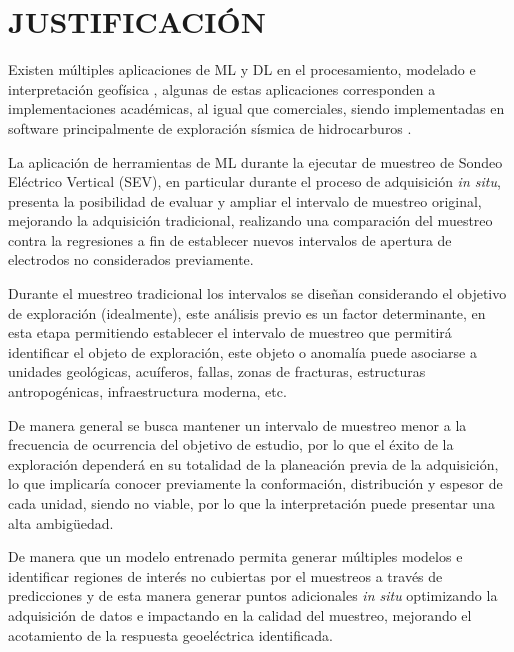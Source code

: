 \chapter{JUSTIFICACIÓN}
Existen múltiples aplicaciones de ML y DL en el procesamiento, modelado e interpretación geofísica \citep{li2024, liu2020,el2001,wrona2018}, algunas de estas aplicaciones corresponden a implementaciones académicas, al igual que comerciales, siendo implementadas en software principalmente de exploración sísmica de hidrocarburos \citep{diaferia2024high, panebianco2024automated}.



La aplicación de herramientas de ML durante la ejecutar de muestreo de Sondeo Eléctrico Vertical (SEV), en particular durante el proceso de adquisición \textit{in situ}, presenta la posibilidad de evaluar y ampliar el intervalo de muestreo original, mejorando la adquisición tradicional, realizando una comparación del muestreo contra la regresiones a fin de establecer nuevos intervalos de apertura de electrodos no considerados previamente.

Durante el muestreo tradicional los intervalos se diseñan considerando el objetivo de exploración (idealmente), este análisis previo es un factor determinante, en esta etapa permitiendo establecer el intervalo de muestreo que permitirá identificar el objeto de exploración, este objeto o anomalía puede asociarse a unidades geológicas, acuíferos, fallas, zonas de fracturas, estructuras antropogénicas, infraestructura moderna, etc.

De manera general se busca mantener un intervalo de muestreo menor a la frecuencia de ocurrencia del objetivo de estudio, por lo que el éxito de la exploración dependerá en su totalidad de la planeación previa de la adquisición, lo que implicaría conocer previamente la conformación, distribución y espesor de cada unidad, siendo no viable, por lo que la interpretación puede presentar una alta ambigüedad.

De manera que un modelo entrenado permita generar múltiples modelos e identificar regiones de interés no cubiertas por el muestreos a través de predicciones y de esta manera generar puntos adicionales \textit{in situ} optimizando la adquisición de datos e impactando en la calidad del muestreo, mejorando el acotamiento de la respuesta geoeléctrica identificada.

